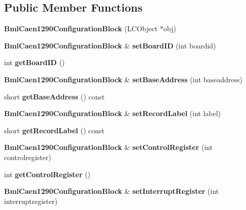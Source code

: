 \subsection*{Public Member Functions}
\begin{DoxyCompactItemize}
\item 
{\bfseries BmlCaen1290ConfigurationBlock} (LCObject $\ast$obj)\label{classCALICE_1_1BmlCaen1290ConfigurationBlock_a2d4ea6c8b939a48a1236a7d38087a469}

\item 
{\bf BmlCaen1290ConfigurationBlock} \& {\bfseries setBoardID} (int boardid)\label{classCALICE_1_1BmlCaen1290ConfigurationBlock_a26eb94a1bcb0960c8c36a8183e88fb7b}

\item 
int {\bfseries getBoardID} ()\label{classCALICE_1_1BmlCaen1290ConfigurationBlock_a7388b9a32d541f9f810e618e4e0090a6}

\item 
{\bf BmlCaen1290ConfigurationBlock} \& {\bfseries setBaseAddress} (int baseaddress)\label{classCALICE_1_1BmlCaen1290ConfigurationBlock_a91ac6d8a2c5ed25692fd031b032286d8}

\item 
short {\bfseries getBaseAddress} () const \label{classCALICE_1_1BmlCaen1290ConfigurationBlock_aa3350ed9c44286ce22dadefa15a3f2b9}

\item 
{\bf BmlCaen1290ConfigurationBlock} \& {\bfseries setRecordLabel} (int label)\label{classCALICE_1_1BmlCaen1290ConfigurationBlock_aa352775bfd0fefd8f159007a848680c7}

\item 
short {\bfseries getRecordLabel} () const \label{classCALICE_1_1BmlCaen1290ConfigurationBlock_aba8ba99a96410f121cbfe9ae0a0712c6}

\item 
{\bf BmlCaen1290ConfigurationBlock} \& {\bfseries setControlRegister} (int controlregister)\label{classCALICE_1_1BmlCaen1290ConfigurationBlock_aac6dd9b7a93bbe7018580d7ed2541994}

\item 
int {\bfseries getControlRegister} ()\label{classCALICE_1_1BmlCaen1290ConfigurationBlock_a44e50c75db94105d7a558450b99b2d5a}

\item 
{\bf BmlCaen1290ConfigurationBlock} \& {\bfseries setInterruptRegister} (int interruptregister)\label{classCALICE_1_1BmlCaen1290ConfigurationBlock_a81599fbfb68917487f0c62b74022fd11}


\end{DoxyCompactItemize}
